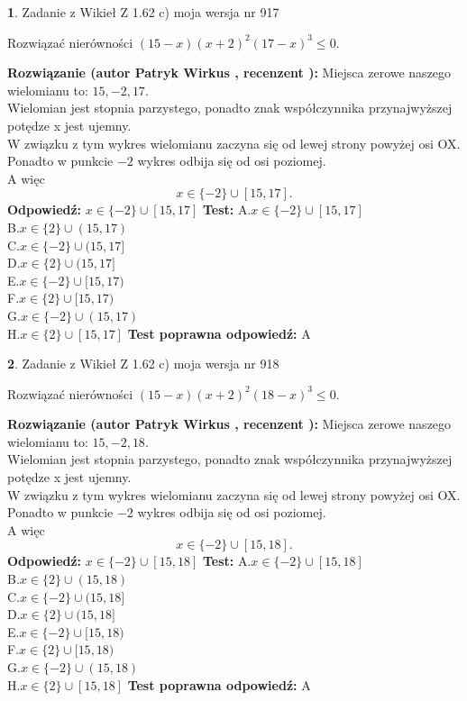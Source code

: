 \documentclass[12pt, a4paper]{article}
\theoremstyle{definition} %
\newtheorem{zad}{}
\newcommand{\zadStart}[1]{\begin{zad}#1\newline}
\newcommand{\zadStop}{\end{zad}}
\newcommand{\rozwStart}[2]{\noindent \textbf{Rozwiązanie (autor #1 , recenzent #2): }\newline}
\newcommand{\rozwStop}{\newline}
\newcommand{\odpStart}{\noindent \textbf{Odpowiedź:}\newline}
\newcommand{\odpStop}{\newline}
\newcommand{\testStart}{\noindent \textbf{Test:}\newline}
\newcommand{\testStop}{\newline}
\newcommand{\kluczStart}{\noindent \textbf{Test poprawna odpowiedź:}\newline}
\newcommand{\kluczStop}{\newline}
\begin{document}
\zadStart{Zadanie z Wikieł Z 1.62 c) moja wersja nr 917}

Rozwiązać nierówności $(15-x)(x+2)^{2}(17-x)^{3}\le0$.
\zadStop
\rozwStart{Patryk Wirkus}{}
Miejsca zerowe naszego wielomianu to: $15, -2, 17$.\\
Wielomian jest stopnia parzystego, ponadto znak współczynnika przy\linebreak najwyższej potędze x jest ujemny.\\ W związku z tym wykres wielomianu zaczyna się od lewej strony powyżej osi OX.\\
Ponadto w punkcie $-2$ wykres odbija się od osi poziomej.\\
A więc $$x \in \{-2\} \cup [15,17].$$
\rozwStop
\odpStart
$x \in \{-2\} \cup [15,17]$
\odpStop
\testStart
A.$x \in \{-2\} \cup [15,17]$\\
B.$x \in \{2\} \cup (15,17)$\\
C.$x \in \{-2\} \cup (15,17]$\\
D.$x \in \{2\} \cup (15,17]$\\
E.$x \in \{-2\} \cup [15,17)$\\
F.$x \in \{2\} \cup [15,17)$\\
G.$x \in \{-2\} \cup (15,17)$\\
H.$x \in \{2\} \cup [15,17]$
\testStop
\kluczStart
A
\kluczStop



\zadStart{Zadanie z Wikieł Z 1.62 c) moja wersja nr 918}

Rozwiązać nierówności $(15-x)(x+2)^{2}(18-x)^{3}\le0$.
\zadStop
\rozwStart{Patryk Wirkus}{}
Miejsca zerowe naszego wielomianu to: $15, -2, 18$.\\
Wielomian jest stopnia parzystego, ponadto znak współczynnika przy\linebreak najwyższej potędze x jest ujemny.\\ W związku z tym wykres wielomianu zaczyna się od lewej strony powyżej osi OX.\\
Ponadto w punkcie $-2$ wykres odbija się od osi poziomej.\\
A więc $$x \in \{-2\} \cup [15,18].$$
\rozwStop
\odpStart
$x \in \{-2\} \cup [15,18]$
\odpStop
\testStart
A.$x \in \{-2\} \cup [15,18]$\\
B.$x \in \{2\} \cup (15,18)$\\
C.$x \in \{-2\} \cup (15,18]$\\
D.$x \in \{2\} \cup (15,18]$\\
E.$x \in \{-2\} \cup [15,18)$\\
F.$x \in \{2\} \cup [15,18)$\\
G.$x \in \{-2\} \cup (15,18)$\\
H.$x \in \{2\} \cup [15,18]$
\testStop
\kluczStart
A
\kluczStop
\end{document}
